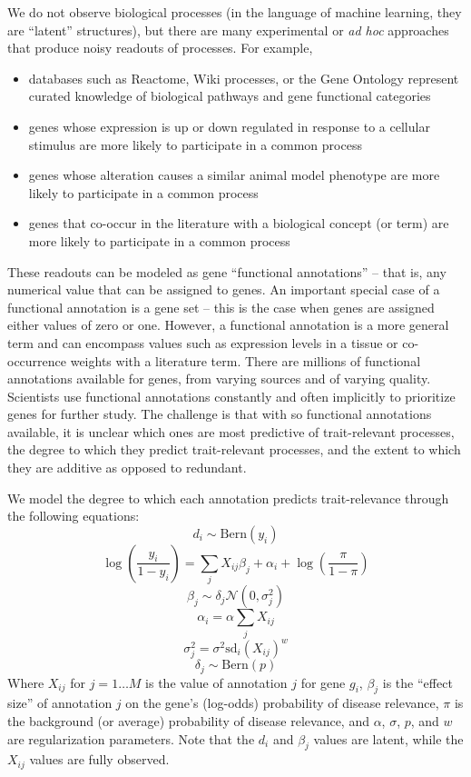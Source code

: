 We do not observe biological processes (in the language of machine
learning, they are ``latent'' structures), but there are many
experimental or \textit{ad hoc} approaches that produce noisy readouts of
processes. For example,
\begin{itemize}
  \item databases such as Reactome\cite{},
Wiki processes\cite{}, or the Gene Ontology\cite{} represent curated
knowledge of biological pathways and gene functional categories
  \item genes whose expression is up or down regulated in response to a cellular stimulus
    are more likely to participate in a common process
  \item genes whose alteration causes a similar animal model phenotype
    are more likely to participate in a common process
  \item genes that co-occur in the literature with a biological
    concept (or term) are more likely to participate in a common process
\end{itemize}
These readouts can be modeled as gene ``functional annotations'' --
that is, any numerical value that can be assigned to genes. An
important special case of a functional annotation is a gene set --
this is the case when genes are assigned either values of zero or
one. However, a functional annotation is a more general term and can
encompass values such as expression levels in a tissue or co-occurrence
weights with a literature term. There are millions of functional
annotations available for genes\cite{}, from varying sources and of
varying quality. Scientists use functional annotations constantly and often
implicitly to prioritize genes for further study. The challenge is
that with so functional annotations available, it is unclear which
ones are most predictive of trait-relevant processes, the degree to
which they predict trait-relevant processes, and the extent to which
they are additive as opposed to redundant.

We model the degree to which each annotation predicts trait-relevance
through the following equations:
\[ d_i \sim \text{Bern}\left(y_i\right) \]
\[ \log(\frac{y_i}{1-y_i}) = \sum_jX_{ij}\beta_j + \alpha_i +
\log\left(\frac{\pi}{1-\pi}\right) \]
\[ \beta_j \sim \delta_j{\mathcal N}\left(0, \sigma_j^2\right) \]
\[ \alpha_i = \alpha \sum_jX_{ij}\]
\[ \sigma_j^2 = \sigma^2 \mathrm{sd}_i\left(X_{ij}\right)^{w}\]
\[ \delta_j \sim \text{Bern}(p) \]
Where $X_{ij}$ for $j=1\ldots M$ is the value of annotation $j$ for gene $g_i$, $\beta_j$
is the ``effect size'' of annotation $j$ on the gene's (log-odds)
probability of disease relevance, $\pi$ is the background (or average) probability
of disease relevance, and $\alpha$, $\sigma$, $p$, and $w$
are regularization parameters. Note that the $d_i$ and $\beta_j$
values are latent, while the $X_{ij}$ values are fully observed.

